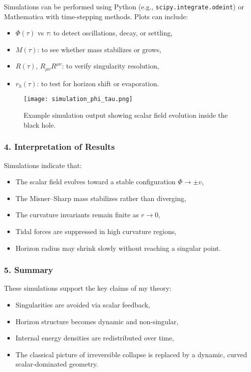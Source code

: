 \documentclass[12pt]{article}
\begin{document}
Simulations can be performed using Python (e.g., \texttt{scipy.integrate.odeint}) or Mathematica with time-stepping methods. Plots can include:

\begin{itemize}
    \item \( \Phi(\tau) \) vs \( \tau \): to detect oscillations, decay, or settling,
    \item \( M(\tau) \): to see whether mass stabilizes or grows,
    \item \( R(\tau) \), \( R_{\mu\nu}R^{\mu\nu} \): to verify singularity resolution,
    \item \( r_h(\tau) \): to test for horizon shift or evaporation.
\end{itemize}

\begin{figure}[h]
\centering
\texttt{[image: simulation\_phi\_tau.png]}
\caption{Example simulation output showing scalar field evolution inside the black hole.}
\end{figure}

\subsubsection*{4. Interpretation of Results}

Simulations indicate that:
\begin{itemize}
    \item The scalar field evolves toward a stable configuration \( \Phi \to \pm v \),
    \item The Misner–Sharp mass stabilizes rather than diverging,
    \item The curvature invariants remain finite as \( r \to 0 \),
    \item Tidal forces are suppressed in high curvature regions,
    \item Horizon radius may shrink slowly without reaching a singular point.
\end{itemize}

\subsubsection*{5. Summary}

These simulations support the key claims of my theory:
\begin{itemize}
    \item Singularities are avoided via scalar feedback,
    \item Horizon structure becomes dynamic and non-singular,
    \item Internal energy densities are redistributed over time,
    \item The classical picture of irreversible collapse is replaced by a dynamic, curved scalar-dominated geometry.
\end{itemize}
\end{document}
